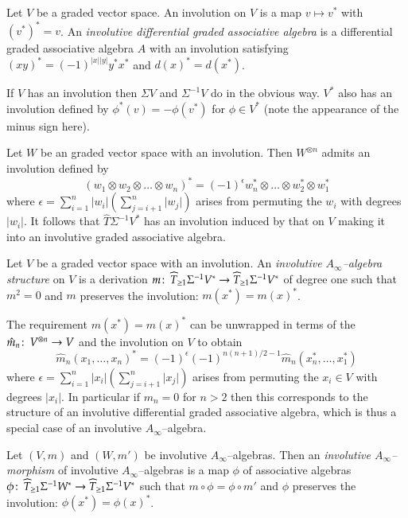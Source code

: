 \documentclass[british]{amsart}
\theoremstyle{plain}
\theoremstyle{definition}
{
\newaliascnt{{definition}}{theorem}\newtheorem{{definition}}[{definition}]{{Definition}}\aliascntresetthe{{definition}}\expandafterautorefname\endcsname{{Definition}}}
{
\newaliascnt{{remark}}{theorem}\newtheorem{{remark}}[{remark}]{{Remark}}\aliascntresetthe{{remark}}\expandafterautorefname\endcsname{{Remark}}}
{
\newaliascnt{{example}}{theorem}\newtheorem{{example}}[{example}]{{Example}}\aliascntresetthe{{example}}\expandafterautorefname\endcsname{{Example}}}
{
\newaliascnt{{examples}}{theorem}\newtheorem{{examples}}[{examples}]{{Examples}}\aliascntresetthe{{examples}}\expandafterautorefname\endcsname{{Examples}}}
{
\newaliascnt{{notation}}{theorem}\newtheorem{{notation}}[{notation}]{{Notation}}\aliascntresetthe{{notation}}\expandafterautorefname\endcsname{{Notation}}}
{
\newaliascnt{{convention}}{theorem}\newtheorem{{convention}}[{convention}]{{Convention}}\aliascntresetthe{{convention}}\expandafterautorefname\endcsname{{Convention}}}
\numberwithin{equation}{section}
\numberwithin{figure}{section}
\begin{document}
\begin{definition}
Let $V$ be a graded vector space. An involution on $V$ is a map $v\mapsto v^*$ with $(v^*)^*=v$. An \emph{involutive differential graded associative algebra} is a differential graded associative algebra $A$ with an involution satisfying $(xy)^* = (-1)^{{\lvert {x} \rvert} {\lvert {y} \rvert}}y^*x^*$ and $d(x)^* = d(x^*)$.
\end{definition}

If $V$ has an involution then $\Sigma V$ and $\Sigma^{-1} V$ do in the obvious way. $V^*$ also has an involution defined by $\phi^*(v) = -\phi(v^*)$ for $\phi\in V^*$ (note the appearance of the minus sign here).

Let $W$ be an graded vector space with an involution. Then $W^{\otimes n}$ admits an involution defined by
\[
(w_1\otimes w_2 \otimes \dots \otimes w_n)^* = (-1)^{\epsilon} w_n^*\otimes\dots\otimes w_2^* \otimes w_1^*
\]
where $\epsilon = \sum_{i=1}^n {\lvert {w_i} \rvert}\left ( \sum_{j=i+1}^n {\lvert {w_j} \rvert} \right )$ arises from permuting the $w_i$ with degrees ${\lvert {w_i} \rvert}$. It follows that $\widehat{T}\Sigma^{-1}V^*$ has an involution induced by that on $V$ making it into an involutive graded associative algebra.

\begin{definition}
Let $V$ be a graded vector space with an involution. An \emph{involutive $A_\infty$--algebra structure} on $V$ is a derivation $m{\colon\thinspace} \widehat{T}_{\geq 1} \Sigma^{-1} V^* \rightarrow \widehat{T}_{\geq 1} \Sigma^{-1} V^*$ of degree one such that $m^2=0$ and $m$ preserves the involution: $m(x^*) = m(x)^*$.
\end{definition}

The requirement $m(x^*) = m(x)^*$ can be unwrapped in terms of the $\hat{m}_n{\colon\thinspace} V^{\otimes n}\rightarrow V$ and the involution on $V$ to obtain
\[
\hat{m}_n(x_1,\dots , x_n)^* = (-1)^{\epsilon}(-1)^{n(n+1)/2-1} \hat{m}_n(x_n^*,\dots,x_1^*)
\]
where $\epsilon = \sum_{i=1}^n {\lvert {x_i} \rvert}\left ( \sum_{j=i+1}^n {\lvert {x_j} \rvert} \right )$ arises from permuting the $x_i\in V$ with degrees ${\lvert {x_i} \rvert}$. In particular if $m_n = 0 $ for $n > 2$ then this corresponds to the structure of an involutive differential graded associative algebra, which is thus a special case of an involutive $A_\infty$--algebra.

\begin{definition}
Let $(V,m)$ and $(W,m')$ be involutive $A_\infty$--algebras. Then an \emph{involutive $A_\infty$--morphism} of involutive $A_\infty$--algebras is a map $\phi$ of associative algebras $\phi{\colon\thinspace}\widehat{T}_{\geq 1}\Sigma^{-1}W^*\rightarrow \widehat{T}_{\geq 1}\Sigma^{-1}V^*$ such that $m \circ\phi = \phi\circ m'$ and $\phi$ preserves the involution: $\phi(x^*) = \phi(x)^*$.
\end{definition}
\end{document}
